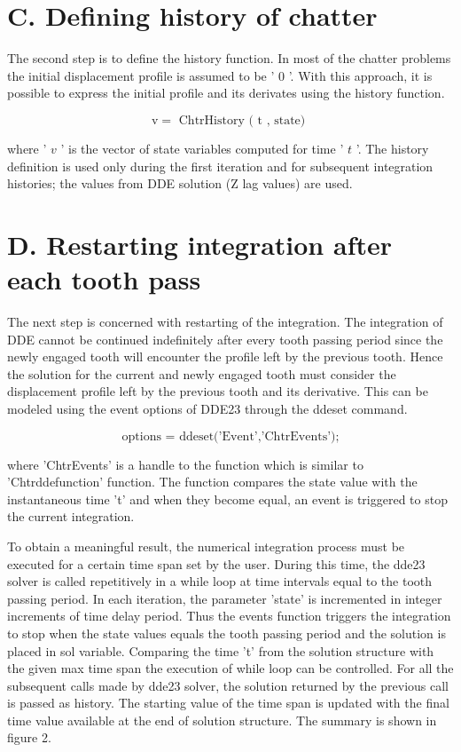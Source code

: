 \documentclass[10pt]{article}
\begin{document}
\section*{C. Defining history of chatter}

The second step is to define the history function. In most of the chatter problems the initial displacement profile is assumed to be ' 0 '. With this approach, it is possible to express the initial profile and its derivates using the history function.

\[
\mathrm{v} = \text{ ChtrHistory ( }\mathrm{t}\text{ , state) } \tag{18}
\]

where ’ \(v\) ’ is the vector of state variables computed for time ’ \(t\) ’. The history definition is used only during the first iteration and for subsequent integration histories; the values from DDE solution (Z lag values) are used.

\section*{D. Restarting integration after each tooth pass}

The next step is concerned with restarting of the integration. The integration of DDE cannot be continued indefinitely after every tooth passing period since the newly engaged tooth will encounter the profile left by the previous tooth. Hence the solution for the current and newly engaged tooth must consider the displacement profile left by the previous tooth and its derivative. This can be modeled using the event options of DDE23 through the ddeset command.

\[
\text{ options = ddeset('Event','ChtrEvents'); } \tag{19}
\]

where 'ChtrEvents' is a handle to the function which is similar to 'Chtrddefunction' function. The function compares the state value with the instantaneous time 't' and when they become equal, an event is triggered to stop the current integration.

To obtain a meaningful result, the numerical integration process must be executed for a certain time span set by the user. During this time, the dde23 solver is called repetitively in a while loop at time intervals equal to the tooth passing period. In each iteration, the parameter 'state' is incremented in integer increments of time delay period. Thus the events function triggers the integration to stop when the state values equals the tooth passing period and the solution is placed in sol variable. Comparing the time 't' from the solution structure with the given max time span the execution of while loop can be controlled. For all the subsequent calls made by dde23 solver, the solution returned by the previous call is passed as history. The starting value of the time span is updated with the final time value available at the end of solution structure. The summary is shown in figure 2.
\end{document}
